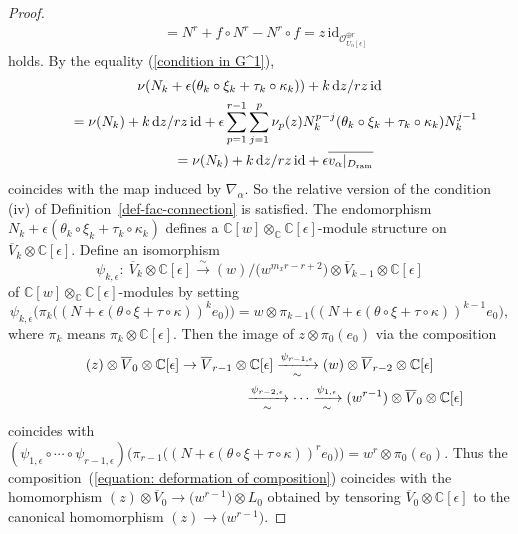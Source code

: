 \documentclass[pdftex]{sigma}
\numberwithin{equation}{section}
\begin{document}
\begin{proof}
\begin{align*}
 &=
 N^r+f\circ N^r-N^r\circ f
 =z\, \mathrm{id}_{{\mathcal O}_{U_{\alpha}[\epsilon]}^{\oplus r}}
\end{align*}
holds.
By the equality (\ref{condition in G^1}),
\begin{gather*}
 \nu ( N_k+\epsilon (\theta_k\circ\xi_k+\tau_k\circ\kappa_k) )
 +k\,{\rm d}z/rz\,\mathrm{id}
 \\
\qquad{} =
 \nu(N_k)+k\,{\rm d}z/rz\,\mathrm{id}
 +\epsilon \sum_{p=1}^{r-1}\sum_{j=1}^p \nu_p(z) N_k^{p-j}
 (\theta_k\circ\xi_k+\tau_k\circ\kappa_k) N_k^{j-1}
 \\
\qquad{} =
 \nu(N_k)+k\,{\rm d}z/rz\,\mathrm{id}
 +\epsilon \overline { v_{\alpha}|_{D_{\rm ram} } }
\end{gather*}
coincides with the map induced by
$\nabla_{\alpha}$.
So the relative version of the condition (iv) of Definition~\ref{def-fac-connection}
is satisfied.
The endomorphism $N_k+\epsilon (\theta_k\circ\xi_k+\tau_k\circ\kappa_k)$ defines a
$\mathbb{C}[w]\otimes_{\mathbb{C}}\mathbb{C}[\epsilon]$-module structure
on $\overline{V}_k\otimes\mathbb{C}[\epsilon]$.
Define an isomorphism
\[
 \psi_{k,\epsilon} \colon \ \overline{V}_k\otimes\mathbb{C}[\epsilon]
 \stackrel{\sim} \longrightarrow
 (w)/\big(w^{m_xr-r+2}\big)\otimes \overline{V}_{k-1}\otimes\mathbb{C}[\epsilon]
\]
of $\mathbb{C}[w]\otimes_{\mathbb{C}}\mathbb{C}[\epsilon]$-modules
by setting
\[
 \psi_{k,\epsilon} \big( \pi_k\big( (N+\epsilon (\theta\circ\xi+\tau\circ\kappa))^ke_0 \big)\big)
 =
 w\otimes \pi_{k-1} \big( (N+\epsilon (\theta\circ\xi+\tau\circ\kappa))^{k-1}e_0 \big) ,
\]
where $\pi_k$ means $\pi_k\otimes\mathbb{C}[\epsilon]$.
Then the image of
$z\otimes \pi_0(e_0)$ via the composition
\begin{gather}
 (z)\otimes \overline{V}_0\otimes\mathbb{C}[\epsilon]
 \rightarrow \overline{V}_{r-1}\otimes\mathbb{C}[\epsilon]
 \xrightarrow[\sim]{\psi_{r-1,\epsilon}}
 (w)\otimes\overline{V}_{r-2}\otimes\mathbb{C}[\epsilon]
\nonumber\\
\hphantom{(z)\otimes \overline{V}_0\otimes\mathbb{C}[\epsilon]
 \rightarrow \overline{V}_{r-1}\otimes\mathbb{C}[\epsilon]}{}
 \xrightarrow[\sim]{\psi_{r-2,\epsilon}}\cdots \xrightarrow[\sim]{\psi_{1,\epsilon}}
 (w^{r-1})\otimes\overline{V}_0\otimes\mathbb{C}[\epsilon]\label{equation: deformation of composition}
\end{gather}
coincides with
$(\psi_{1,\epsilon}\circ\cdots\circ\psi_{r-1,\epsilon})
\big(\pi_{r-1}\big( (N+\epsilon (\theta\circ\xi+\tau\circ\kappa))^re_0\big)\big)
=w^r\otimes \pi_0(e_0)$.
Thus the composition~(\ref{equation: deformation of composition})
coincides with the homomorphism
$(z)\otimes\overline{V}_0\longrightarrow \big(w^{r-1}\big)\otimes L_0$
obtained by tensoring $\overline{V}_0\otimes\mathbb{C}[\epsilon]$ to
the canonical homomorphism $(z)\longrightarrow \big(w^{r-1}\big)$.


\end{proof}
\end{document}
